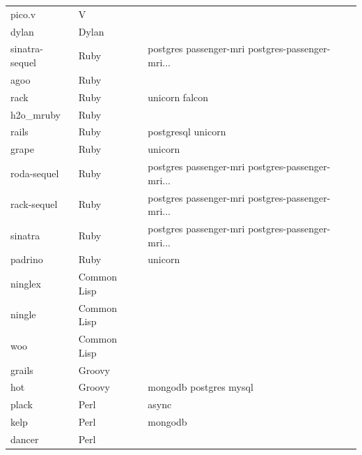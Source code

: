 \begin{longtable}{lll}
    \bottomrule
    \endlastfoot
    pico.v           & V           &                                                    \\
    dylan            & Dylan       &                                                    \\
    sinatra-sequel   & Ruby        & postgres passenger-mri postgres-passenger-mri...   \\
    agoo             & Ruby        &                                                    \\
    rack             & Ruby        & unicorn falcon                                     \\
    h2o\_mruby       & Ruby        &                                                    \\
    rails            & Ruby        & postgresql unicorn                                 \\
    grape            & Ruby        & unicorn                                            \\
    roda-sequel      & Ruby        & postgres passenger-mri postgres-passenger-mri...   \\
    rack-sequel      & Ruby        & postgres passenger-mri postgres-passenger-mri...   \\
    sinatra          & Ruby        & postgres passenger-mri postgres-passenger-mri...   \\
    padrino          & Ruby        & unicorn                                            \\
    ninglex          & Common Lisp &                                                    \\
    ningle           & Common Lisp &                                                    \\
    woo              & Common Lisp &                                                    \\
    grails           & Groovy      &                                                    \\
    hot              & Groovy      & mongodb postgres mysql                             \\
    plack            & Perl        & async                                              \\
    kelp             & Perl        & mongodb                                            \\
    dancer           & Perl        &                                                    \\

\end{longtable}
